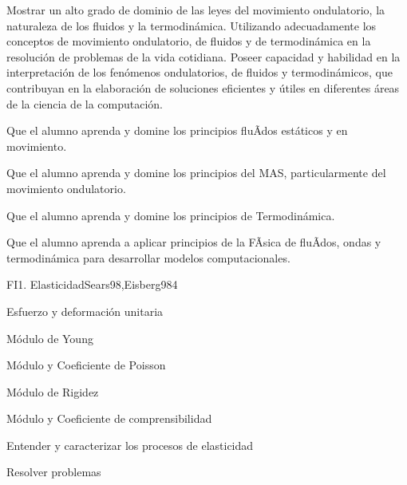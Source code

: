 \begin{syllabus}


\begin{justification}
Mostrar un alto grado de dominio de las leyes del movimiento ondulatorio, la naturaleza de los fluidos y la termodinámica. Utilizando adecuadamente los conceptos de movimiento ondulatorio, de fluidos y de termodinámica en la resolución de problemas de la vida cotidiana. Poseer capacidad y habilidad en la interpretación de los fenómenos ondulatorios, de fluidos y termodinámicos, que contribuyan en la elaboración de soluciones eficientes y útiles en diferentes áreas de la ciencia de la computación.
\end{justification}

\begin{goals}
\item  Que el alumno aprenda y domine los principios fluÃ­dos estáticos y en movimiento.
\item  Que el alumno aprenda y domine los principios del MAS, particularmente del movimiento ondulatorio.
\item  Que el alumno aprenda y domine los principios de Termodinámica.
\item  Que el alumno aprenda a aplicar principios de la FÃ­sica de fluÃ­dos, ondas y termodinámica para desarrollar modelos computacionales.
\end{goals}

\begin{outcomes}
\end{outcomes}

\begin{unit}{FI1. Elasticidad}{Sears98,Eisberg98}{4}
\begin{topics}
         \item  Esfuerzo y deformación unitaria
	 \item  Módulo de Young
         \item  Módulo y Coeficiente de Poisson
	 \item  Módulo de Rigidez
         \item  Módulo y Coeficiente de comprensibilidad
   \end{topics}

   \begin{unitgoals}
         \item  Entender y caracterizar los procesos de elasticidad
         \item  Resolver problemas
   \end{unitgoals}
\end{unit}


\end{syllabus}
